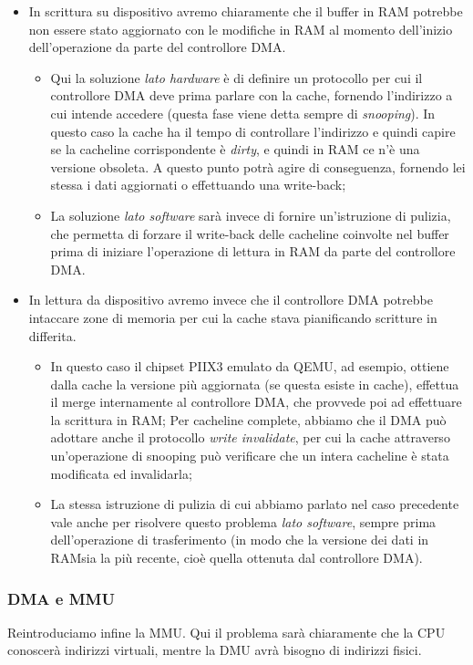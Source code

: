 \documentclass[a4paper,11pt]{article}
\begin{document}
\begin{itemize}
	\item 
		In scrittura su dispositivo avremo chiaramente che il buffer in RAM potrebbe non essere stato aggiornato con le modifiche in RAM al momento dell'inizio dell'operazione da parte del controllore DMA.
		\begin{itemize}
			\item Qui la soluzione \textit{lato hardware} è di definire un protocollo per cui il controllore DMA deve prima parlare con la cache, fornendo l'indirizzo a cui intende accedere (questa fase viene detta sempre di \textit{snooping}).
				In questo caso la cache ha il tempo di controllare l'indirizzo e quindi capire se la cacheline corrispondente è \textit{dirty}, e quindi in RAM ce n'è una versione obsoleta.
				A questo punto potrà agire di conseguenza, fornendo lei stessa i dati aggiornati o effettuando una write-back;
			\item La soluzione \textit{lato software} sarà invece di fornire un'istruzione di pulizia, che permetta di forzare il write-back delle cacheline coinvolte nel buffer prima di iniziare l'operazione di lettura in RAM da parte del controllore DMA.
		\end{itemize}
	\item
		In lettura da dispositivo avremo invece che il controllore DMA potrebbe intaccare zone di memoria per cui la cache stava pianificando scritture in differita.
	\begin{itemize}
		\item In questo caso il chipset PIIX3 emulato da QEMU, ad esempio, ottiene dalla cache la versione più aggiornata (se questa esiste in cache), effettua il merge internamente al controllore DMA, che provvede poi ad effettuare la scrittura in RAM;
		Per cacheline complete, abbiamo che il DMA può adottare anche il protocollo \textit{write invalidate}, per cui la cache attraverso un'operazione di snooping può verificare che un intera cacheline è stata modificata ed invalidarla;
	\item La stessa istruzione di pulizia di cui abbiamo parlato nel caso precedente vale anche per risolvere questo problema \textit{lato software}, sempre prima dell'operazione di trasferimento (in modo che la versione dei dati in RAMsia la più recente, cioè quella ottenuta dal controllore DMA).
\end{itemize}
\end{itemize}

\subsubsection{DMA e MMU}
Reintroduciamo infine la MMU.
Qui il problema sarà chiaramente che la CPU conoscerà indirizzi virtuali, mentre la DMU avrà bisogno di indirizzi fisici.
\end{document}
